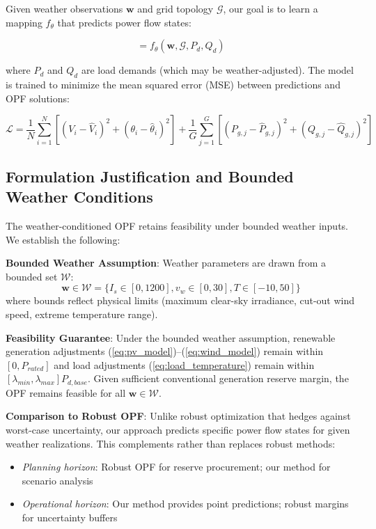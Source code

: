 \documentclass[journal,12pt,onecolumn]{IEEEtran}
\begin{document}
Given weather observations $\mathbf{w}$ and grid topology $\mathcal{G}$, our goal is to learn a mapping $f_\theta$ that predicts power flow states:

\begin{equation}
[\hat{V}, \hat{\theta}, \hat{P}_g, \hat{Q}_g] = f_\theta(\mathbf{w}, \mathcal{G}, P_d, Q_d)
\label{eq:learning_objective}
\end{equation}

where $P_d$ and $Q_d$ are load demands (which may be weather-adjusted). The model is trained to minimize the mean squared error (MSE) between predictions and OPF solutions:

\begin{equation}
\mathcal{L} = \frac{1}{N}\sum_{i=1}^{N} \left[ (V_i - \hat{V}_i)^2 + (\theta_i - \hat{\theta}_i)^2 \right] + \frac{1}{G}\sum_{j=1}^{G} \left[ (P_{g,j} - \hat{P}_{g,j})^2 + (Q_{g,j} - \hat{Q}_{g,j})^2 \right]
\label{eq:loss_function}
\end{equation}

\subsection{Formulation Justification and Bounded Weather Conditions}

The weather-conditioned OPF retains feasibility under bounded weather inputs. We establish the following:

\textbf{Bounded Weather Assumption}: Weather parameters are drawn from a bounded set $\mathcal{W}$:
\begin{equation}
\mathbf{w} \in \mathcal{W} = \{I_s \in [0, 1200], v_w \in [0, 30], T \in [-10, 50]\}
\label{eq:bounded_weather}
\end{equation}
where bounds reflect physical limits (maximum clear-sky irradiance, cut-out wind speed, extreme temperature range).

\textbf{Feasibility Guarantee}: Under the bounded weather assumption, renewable generation adjustments (\ref{eq:pv_model})--(\ref{eq:wind_model}) remain within $[0, P_{rated}]$ and load adjustments (\ref{eq:load_temperature}) remain within $[\lambda_{min}, \lambda_{max}]P_{d,base}$. Given sufficient conventional generation reserve margin, the OPF remains feasible for all $\mathbf{w} \in \mathcal{W}$.

\textbf{Comparison to Robust OPF}: Unlike robust optimization that hedges against worst-case uncertainty, our approach predicts specific power flow states for given weather realizations. This complements rather than replaces robust methods:
\begin{itemize}
    \item \textit{Planning horizon}: Robust OPF for reserve procurement; our method for scenario analysis
    \item \textit{Operational horizon}: Our method provides point predictions; robust margins for uncertainty buffers
\end{itemize}
\end{document}
